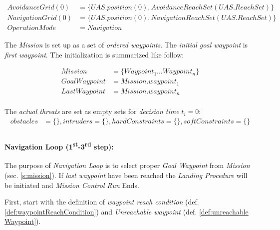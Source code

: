 \begin{equation}
    \begin{aligned}
    Avoidance Grid(0) &= \{UAS.position(0),AvoidanceReachSet(UAS.ReachSet)\}\\
    Navigation Grid (0) &= \{UAS.position(0), NavigationReachSet(UAS.ReachSet)\}\\
    Operation Mode &= Navigation
    \end{aligned}
\end{equation}

The \emph{Mission} is set up as a set of \emph{ordered waypoints}. The \emph{initial goal waypoint} is \emph{first waypoint}. The initialization is summarized like follow:

\begin{equation}
    \begin{aligned}
    Mission &= \{Waypoint_1 \dots  Waypoint_n\}\\
    Goal Waypoint &= Mission.waypoint_1\\
    Last Waypoint &= Mission.waypoint_n\\
    \end{aligned}
\end{equation}

The \emph{actual threats} are set as empty sets for \emph{decision time} $t_i=0$:
\begin{equation}
    \begin{aligned}
    obstacles &= \{\}, intruders = \{\}, hard Constraints = \{\}, soft Constraints = \{\}\\
    \end{aligned}
\end{equation}



\paragraph{Navigation Loop (1\textsuperscript{st}-3\textsuperscript{rd} step):} The purpose of \emph{Navigation Loop} is to select proper \emph{Goal Waypoint} from \emph{Mission} (sec. \ref{s:mission}). If \emph{last waypoint} have been reached the \emph{Landing Procedure} will be initiated and \emph{Mission Control Run} Ends.

First, start with the definition of \emph{waypoint reach condition} (def. \ref{def:waypointReachCondition}) and \emph{Unreachable waypoint} (def. \ref{def:unreachable Waypoint}).

